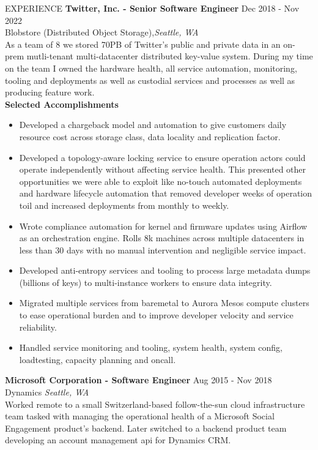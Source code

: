 \begin{rSection}{EXPERIENCE}
\textbf{Twitter, Inc. - Senior Software Engineer} \hfill Dec 2018 - Nov 2022\\
Blobstore (Distributed Object Storage),\hfill \textit{Seattle, WA}  \vspace{1em} \\
As a team of 8 we stored 70PB of Twitter's public and private data in an on-prem mutli-tenant multi-datacenter distributed key-value system. During my time on the team I owned the hardware health, all service automation, monitoring, tooling and deployments as well as custodial services and processes as well as producing feature work.
\vspace{1em}\\
{\bf Selected Accomplishments}
 \begin{itemize}
    \itemsep -3pt {} 
     \item Developed a chargeback model and automation to give customers daily resource cost across storage class, data locality and replication factor. 
     \item Developed a topology-aware locking service to ensure operation actors could operate independently without affecting service health. This presented other opportunities we were able to exploit like no-touch automated deployments and hardware lifecycle automation that removed developer weeks of operation toil and increased deployments from monthly to weekly. 
     \item Wrote compliance automation for kernel and firmware updates using Airflow as an orchestration engine. Rolls 8k machines across multiple datacenters in less than 30 days with no manual intervention and negligible service impact. 
     \item Developed anti-entropy services and tooling to process large metadata dumps (billions of keys) to multi-instance workers to ensure data integrity. 
     \item Migrated multiple services from baremetal to Aurora Mesos compute clusters to ease operational burden and to improve developer velocity and service reliability.
     \item Handled service monitoring and tooling, system health, system config, loadtesting, capacity planning and oncall.
 \end{itemize}
\vspace{1em}
\textbf{Microsoft Corporation - Software Engineer} \hfill Aug 2015 - Nov 2018\\
Dynamics  \hfill \textit{Seattle, WA} \vspace{1em} \\
Worked remote to a small Switzerland-based follow-the-sun cloud infrastructure team tasked with managing the operational health of a Microsoft Social Engagement product's backend. Later switched to a backend product team developing an account management api for Dynamics CRM.\vspace{0.5em}
\end{rSection} 